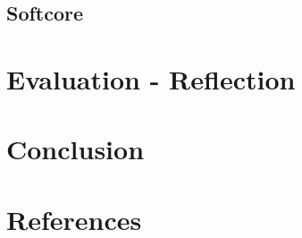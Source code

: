 \documentclass[12p]{article}
\begin{document}
\subsection{Softcore}
\label{Design:Softcore}





\newpage
\section{Evaluation - Reflection}
\label{Evaluation-Reflection}




\section{Conclusion}
\label{Conclusion}







\newpage
\section*{References}






\end{document}

